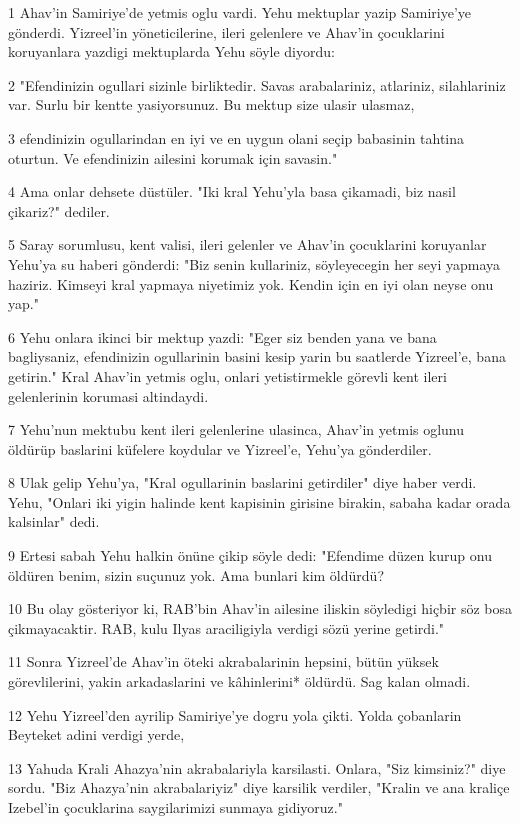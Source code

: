 \par 1 Ahav'in Samiriye'de yetmis oglu vardi. Yehu mektuplar yazip Samiriye'ye gönderdi. Yizreel'in yöneticilerine, ileri gelenlere ve Ahav'in çocuklarini koruyanlara yazdigi mektuplarda Yehu söyle diyordu:
\par 2 "Efendinizin ogullari sizinle birliktedir. Savas arabalariniz, atlariniz, silahlariniz var. Surlu bir kentte yasiyorsunuz. Bu mektup size ulasir ulasmaz,
\par 3 efendinizin ogullarindan en iyi ve en uygun olani seçip babasinin tahtina oturtun. Ve efendinizin ailesini korumak için savasin."
\par 4 Ama onlar dehsete düstüler. "Iki kral Yehu'yla basa çikamadi, biz nasil çikariz?" dediler.
\par 5 Saray sorumlusu, kent valisi, ileri gelenler ve Ahav'in çocuklarini koruyanlar Yehu'ya su haberi gönderdi: "Biz senin kullariniz, söyleyecegin her seyi yapmaya haziriz. Kimseyi kral yapmaya niyetimiz yok. Kendin için en iyi olan neyse onu yap."
\par 6 Yehu onlara ikinci bir mektup yazdi: "Eger siz benden yana ve bana bagliysaniz, efendinizin ogullarinin basini kesip yarin bu saatlerde Yizreel'e, bana getirin." Kral Ahav'in yetmis oglu, onlari yetistirmekle görevli kent ileri gelenlerinin korumasi altindaydi.
\par 7 Yehu'nun mektubu kent ileri gelenlerine ulasinca, Ahav'in yetmis oglunu öldürüp baslarini küfelere koydular ve Yizreel'e, Yehu'ya gönderdiler.
\par 8 Ulak gelip Yehu'ya, "Kral ogullarinin baslarini getirdiler" diye haber verdi. Yehu, "Onlari iki yigin halinde kent kapisinin girisine birakin, sabaha kadar orada kalsinlar" dedi.
\par 9 Ertesi sabah Yehu halkin önüne çikip söyle dedi: "Efendime düzen kurup onu öldüren benim, sizin suçunuz yok. Ama bunlari kim öldürdü?
\par 10 Bu olay gösteriyor ki, RAB'bin Ahav'in ailesine iliskin söyledigi hiçbir söz bosa çikmayacaktir. RAB, kulu Ilyas araciligiyla verdigi sözü yerine getirdi."
\par 11 Sonra Yizreel'de Ahav'in öteki akrabalarinin hepsini, bütün yüksek görevlilerini, yakin arkadaslarini ve kâhinlerini* öldürdü. Sag kalan olmadi.
\par 12 Yehu Yizreel'den ayrilip Samiriye'ye dogru yola çikti. Yolda çobanlarin Beyteket adini verdigi yerde,
\par 13 Yahuda Krali Ahazya'nin akrabalariyla karsilasti. Onlara, "Siz kimsiniz?" diye sordu. "Biz Ahazya'nin akrabalariyiz" diye karsilik verdiler, "Kralin ve ana kraliçe Izebel'in çocuklarina saygilarimizi sunmaya gidiyoruz."
